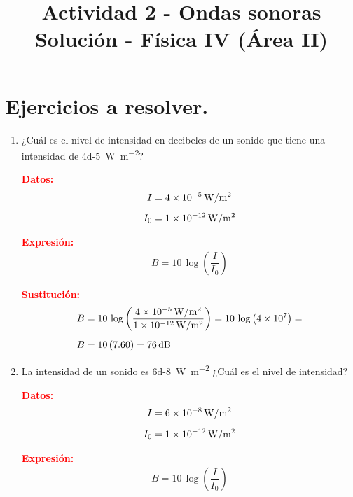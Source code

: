 \documentclass[14pt]{extarticle}
\title{\vspace*{-2cm} Actividad 2 - Ondas sonoras \\ Solución - Física IV (Área II) \vspace{-5ex}}
\date{}
\newcommand{\textocolor}[2]{\textbf{\textcolor{#1}{#2}}}
\begin{document}
\maketitle

\section*{Ejercicios a resolver.}

\begin{enumerate}
\item ¿Cuál es el nivel de intensidad en decibeles de un sonido que tiene una intensidad de \SI{4d-5}{\watt\per\square\meter}?

\begin{minipage}[t]{0.4\linewidth}
\textocolor{red}{Datos:}
\begin{align*}
I &= \SI{4d-5}{\watt\per\square\meter} \\[0.5em]
I_{0} &= \SI{1d-12}{\watt\per\square\meter}
\end{align*}
\end{minipage}
\hspace{0.4cm}
\begin{minipage}[t]{0.4\linewidth}
\textocolor{red}{Expresión:}
\begin{align*}
B = 10 \, \log \left( \dfrac{I}{I_{0}} \right)
\end{align*}
\end{minipage}

\textocolor{red}{Sustitución:}
\begin{align*}
B &= 10 \, \log \left( \dfrac{\SI{4d-5}{\watt\per\square\meter}}{\SI{1d-12}{\watt\per\square\meter}} \right) = 10 \, \log \left( \num{4d7} \right) = \\[0.5em]
B &= 10 \, (7.60) = \SI{76}{\dB}
\end{align*}
\item La intensidad de un sonido es \SI{6d-8}{\watt\per\square\meter} ¿Cuál es el nivel de intensidad?

\begin{minipage}[t]{0.4\linewidth}
\textocolor{red}{Datos:}
\begin{align*}
I &= \SI{6d-8}{\watt\per\square\meter} \\[0.5em]
I_{0} &= \SI{1d-12}{\watt\per\square\meter}
\end{align*}
\end{minipage}
\hspace{0.4cm}
\begin{minipage}[t]{0.4\linewidth}
\textocolor{red}{Expresión:}
\begin{align*}
B = 10 \, \log \left( \dfrac{I}{I_{0}} \right)
\end{align*}
\end{minipage}


\end{enumerate}
\end{document}
